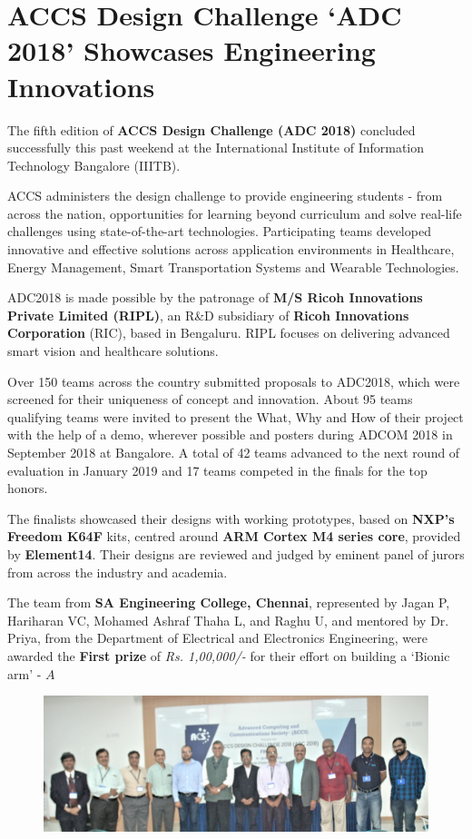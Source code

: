 \chapter{ACCS Design Challenge ‘ADC 2018’ Showcases Engineering Innovations}

\begin{multicols}{2}

The fifth edition of \textbf{ACCS Design Challenge (ADC 2018)} concluded successfully this past weekend at the International Institute of Information Technology Bangalore (IIITB). 

ACCS administers the design challenge to provide engineering students - from across the nation, opportunities for learning beyond curriculum and solve real-life challenges using state-of-the-art technologies. Participating teams developed innovative and effective solutions across application environments in Healthcare, Energy Management, Smart Transportation Systems and Wearable Technologies. 

ADC2018 is made possible by the patronage of \textbf{M/S Ricoh Innovations Private Limited (RIPL)}, an R\&D subsidiary of \textbf{Ricoh Innovations Corporation} (RIC), based in Bengaluru. RIPL focuses on delivering advanced smart vision and healthcare solutions. 

Over 150 teams across the country submitted proposals to ADC2018, which were screened for their uniqueness of concept and innovation. About 95 teams qualifying teams were invited to present the What, Why and How of their project with the help of a demo, wherever possible and posters during ADCOM 2018 in September 2018 at Bangalore. A total of 42 teams advanced to the next round of evaluation in January 2019 and 17 teams competed in the finals for the top honors. 

The finalists showcased their designs with working prototypes, based on \textbf{NXP's Freedom K64F} kits, centred around \textbf{ARM Cortex M4 series core}, provided by \textbf{Element14}. Their designs are reviewed and judged by eminent panel of jurors from across the industry and academia.

The team from \textbf{SA Engineering College, Chennai}, represented by Jagan P, Hariharan VC, Mohamed Ashraf Thaha L, and Raghu U, and mentored by Dr. Priya, from the Department of Electrical and Electronics Engineering, were awarded the \textbf{First prize} of \textit{Rs. 1,00,000/-} for their effort on building a `Bionic arm' - $A$ 

\end{multicols}

\begin{figure}[H]
\centering
\includegraphics[scale=1.47]{src/Figures/adc.jpg}
\end{figure}


